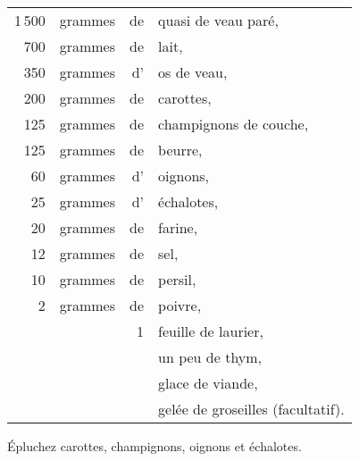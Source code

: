 \footnotesize
\begin{longtable}{rrrp{16em}}
  1 500 & grammes & de & quasi de veau paré,                                                              \\
    700 & grammes & de & lait,                                                                            \\
    350 & grammes & d' & os de veau,                                                                      \\
    200 & grammes & de & carottes,                                                                        \\
    125 & grammes & de & champignons de couche,                                                           \\
    125 & grammes & de & beurre,                                                                          \\
     60 & grammes & d' & oignons,                                                                         \\
     25 & grammes & d’ & échalotes,                                                                       \\
     20 & grammes & de & farine,                                                                          \\
     12 & grammes & de & sel,                                                                             \\
     10 & grammes & de & persil,                                                                          \\
      2 & grammes & de & poivre,                                                                          \\
        &         &  1 & feuille de laurier,                                                              \\
        &         &    & un peu de thym,                                                                  \\
        &         &    & glace de viande,                                                                 \\
        &         &    & gelée de groseilles (facultatif).                                                \\
\end{longtable}
\normalsize

Épluchez carottes, champignons, oignons et échalotes.

